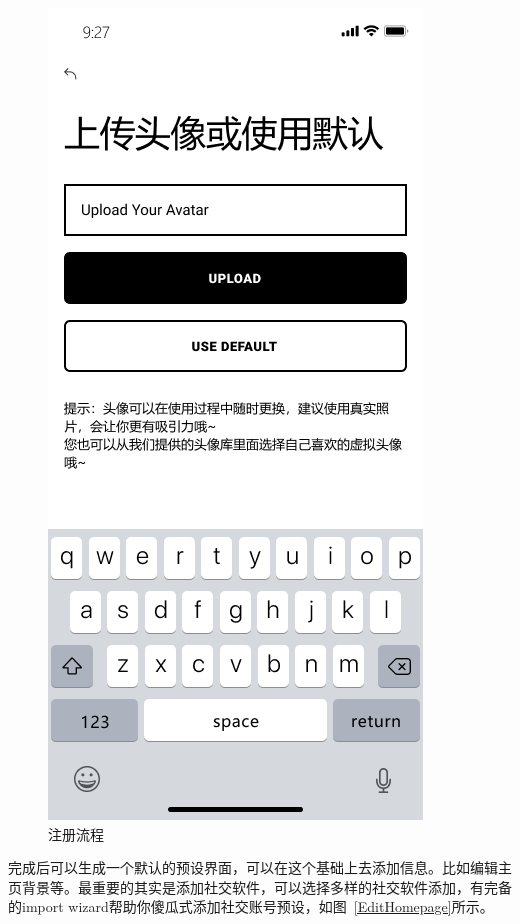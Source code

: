 \documentclass[UTF8]{ctexart}
\begin{document}
\begin{figure}[htbp]
{\begin{minipage}[b]{.3\linewidth}
            \includegraphics[scale=0.3]{Registerstep3.png}
        \end{minipage}
    }
    \caption{注册流程}
    \label{Register}
\end{figure}

完成后可以生成一个默认的预设界面，可以在这个基础上去添加信息。比如编辑主页背景等。最重要的其实是添加社交软件，可以选择多样的社交软件添加，有完备的import wizard帮助你傻瓜式添加社交账号预设，如图~\ref{EditHomepage}所示。
\end{document}
